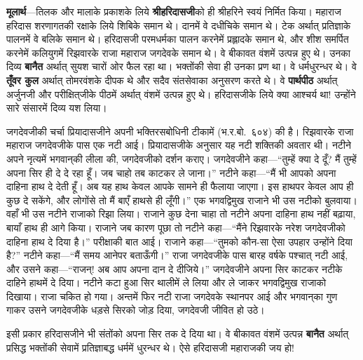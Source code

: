 \begin{sloppypar}\justifying{}
\textbf{मूलार्थ}—तिलक और मालाके प्रकाशके लिये \textbf{श्रीहरिदासजी}को ही श्रीहरिने स्वयं निर्मित किया। महाराज हरिदास शरणागतकी रक्षाके लिये शिबिके समान थे। दानमें वे दधीचिके समान थे। टेक अर्थात् प्रतिज्ञाके पालनमें वे बलिके समान थे। हरिदासजी परमधर्मका पालन करनेमें प्रह्लादके समान थे, और शीश समर्पित करनेमें कलियुगमें रिझवारके राजा महाराज जगदेवके समान थे। वे बीकावत वंशमें उत्पन्न हुए थे। उनका दिव्य \textbf{बानैत} अर्थात् सुयश चारों ओर फैल रहा था। भक्तोंकी सेवा ही उनका प्रण था। वे धर्म\-धुरन्धर थे। वे \textbf{तूँवर कुल} अर्थात् तोमरवंशके दीपक थे और सदैव संत\-सेवाका अनुसरण करते थे। वे \textbf{पार्थपीठ} अर्थात् अर्जुनजी और परीक्षित्‌जीके पीठमें अर्थात् वंशमें उत्पन्न हुए थे। हरिदासजीके लिये क्या आश्चर्य था! उन्होंने सारे संसारमें दिव्य यश लिया।
\end{sloppypar}
\begin{sloppypar}\justifying{}
जगदेवजीकी चर्चा प्रियादासजीने अपनी भक्तिरसबोधिनी टीकामें (भ.र.बो.~६०४) की है। रिझवारके राजा महाराज जगदेवजीके पास एक नटी आई। प्रियादासजीके अनुसार यह नटी शक्तिकी अवतार थी। नटीने अपने नृत्यमें भगवान्‌की लीला की, जगदेवजीको दर्शन कराए। जगदेवजीने कहा—“तुम्हें क्या दे दूँ? मैं तुम्हें अपना सिर ही दे दे रहा हूँ। जब चाहो तब काटकर ले जाना।” नटीने कहा—“मैं भी आपको अपना दाहिना हाथ दे देती हूँ। अब यह हाथ केवल आपके सामने ही फैलाया जाएगा। इस हाथपर केवल आप ही कुछ दे सकेंगे, और लोगोंसे तो मैं बाएँ हाथसे ही लूँगी।” एक भगवद्विमुख राजाने भी उस नटीको बुलवाया। वहाँ भी उस नटीने राजाको रिझा लिया। राजाने कुछ देना चाहा तो नटीने अपना दाहिना हाथ नहीं बढ़ाया, बायाँ हाथ ही आगे किया। राजाने जब कारण पूछा तो नटीने कहा—“मैंने रिझवारके नरेश जगदेवजीको दाहिना हाथ दे दिया है।” परीक्षाकी बात आई। राजाने कहा—“तुमको कौन-सा ऐसा उपहार उन्होंने दिया है?” नटीने कहा—“मैं समय आनेपर बताऊँगी।” राजा जगदेवजीके पास बारह वर्षके पश्चात् नटी आई, और उसने कहा—“राजन्! अब आप अपना दान दे दीजिये।” जगदेवजीने अपना सिर काटकर नटीके दाहिने हाथमें दे दिया। नटीने कटा हुआ सिर थालीमें ले लिया और ले जाकर भगवद्विमुख राजाको दिखाया। राजा चकित हो गया। अन्तमें फिर नटी राजा जगदेवके स्थानपर आई और भगवान्‌का गुण गाकर उसने जगदेवजीके धड़से सिरको जोड़ दिया, जगदेवजी जीवित हो उठे।
\end{sloppypar}
\begin{sloppypar}\justifying{}
इसी प्रकार हरिदासजीने भी संतोंको अपना सिर तक दे दिया था। वे बीकावत वंशमें उत्पन्न \textbf{बानैत} अर्थात् प्रसिद्ध भक्तोंकी सेवामें प्रतिज्ञाबद्ध धर्ममें धुरन्धर थे। ऐसे हरिदासजी महाराजकी जय हो!
\end{sloppypar}

